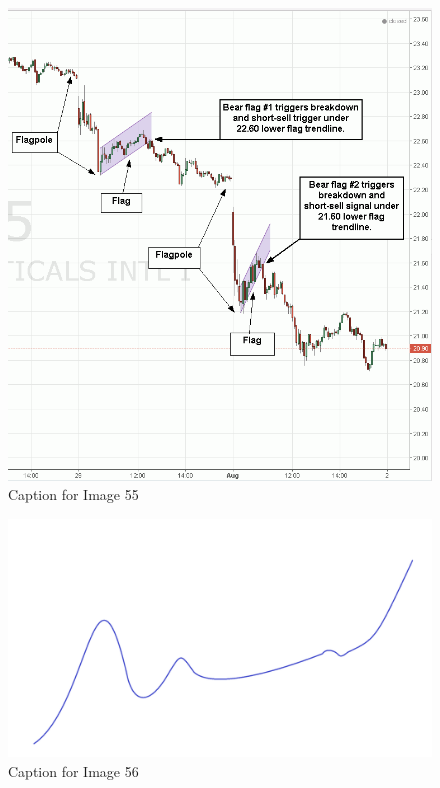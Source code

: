\documentclass{article}
\begin{document}
\begin{figure}[!htb]
    \centering
    \includegraphics[width=\textwidth]{imgs/55.png}
    \caption{Caption for Image 55}
\end{figure}

\vspace{10pt}

\begin{figure}[!htb]
    \centering
    \includegraphics[width=\textwidth]{imgs/56.png}
    \caption{Caption for Image 56}
\end{figure}
\end{document}
